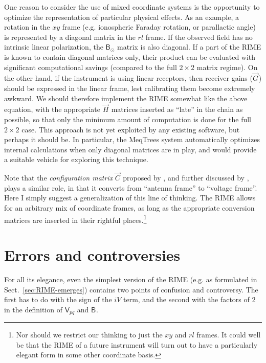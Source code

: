 \documentclass{aa}
\newcommand{\jones}[2]{\vec {#1}_{#2}}
\newcommand{\coh}[2]{\mathsf{{#1}}_{{#2}}}
\begin{document}
One reason to consider the use of mixed coordinate systems is the opportunity to optimize the representation of particular physical effects. As an example, a rotation in the $xy$ frame (e.g. ionospheric Faraday rotation, or parallactic angle) is represented by a diagonal matrix in the $rl$ frame. If the observed field has no intrinsic linear polarization, the $\coh{B}{\odot}$ matrix is also diagonal. If a part of the RIME is known to contain diagonal matrices only, their product can be evaluated with significant computational savings (compared to the full $2\times2$ matrix regime). On the other hand, if the instrument is using linear receptors, then receiver gains ($\jones{G}{}$) should be expressed in the linear frame, lest calibrating them become extremely awkward. We should therefore implement the RIME somewhat like the above equation, with the appropriate $\jones{H}{}$ matrices inserted as ``late'' in the chain as possible, so that only the minimum amount of computation is done for the full $2\times2$ case. This approach is not yet exploited by any existing software, but perhaps it should be. In particular, the MeqTrees system \citep{meqtrees} automatically optimizes internal calculations when only diagonal matrices are in play, and would provide a suitable vehicle for exploring this technique.

Note that the {\em configuration matrix} $\jones{C}{}$ proposed by \citet{ME1}, and further discussed by \citet{JEN:note185}, plays a similar role, in that it converts from ``antenna frame'' to ``voltage frame''. Here I simply suggest a generalization of this line of thinking. The RIME allows for an arbitrary mix of coordinate frames, as long as the appropriate conversion matrices are inserted in their rightful places.\footnote{Nor should we restrict our thinking to just the $xy$ and $rl$ frames. It could well be that the RIME of a future instrument will turn out to have a particularly elegant form in some other coordinate basis.}

\section{Errors and controversies\label{sec:controversies}}

For all its elegance, even the simplest version of the RIME (e.g. as formulated in Sect.~\ref{sec:RIME-emerges}) contains two points of confusion and controversy. The first has to do with the sign of the $iV$ term, and the second with the factors of 2 in the definition of $\coh{V}{pq}$ and $\coh{B}{}$.
\end{document}

